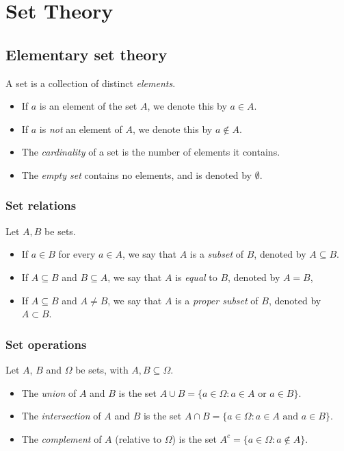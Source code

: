 \chapter{Set Theory}\label{chap:sets}
\section{Elementary set theory}
A set is a collection of distinct \emph{elements}.
\begin{itemize}
\item If $a$ is an element of the set $A$, we denote this by $a\in A$.
\item If $a$ is \emph{not} an element of $A$, we denote this by $a\notin A$.
\item The \emph{cardinality} of a set is the number of elements it contains.
\item The \emph{empty set} contains no elements, and is denoted by $\emptyset$.
\end{itemize}

\subsection{Set relations}
Let $A,B$ be sets. 
\begin{itemize}
\item If $a\in B$ for every $a\in A$, we say that $A$ is a \emph{subset} of $B$, denoted by $A\subseteq B$.
\item If $A\subseteq B$ and $B\subseteq A$, we say that $A$ is \emph{equal} to $B$, denoted by $A=B$, 
\item If $A\subseteq B$ and $A\neq B$, we say that $A$ is a \emph{proper subset} of $B$, denoted by $A\subset B$.
\end{itemize}

\subsection{Set operations}
Let $A$, $B$ and $\Omega$ be sets, with $A,B\subseteq \Omega$.
\begin{itemize}
\item The \emph{union} of $A$ and $B$ is the set $A\cup B = \{a\in \Omega: a\in A \text{ or }a\in B\}$.
\item The \emph{intersection} of $A$ and $B$ is the set $A\cap B = \{a\in \Omega: a\in A \text{ and }a\in B\}$.
\item The \emph{complement} of $A$ (relative to $\Omega$) is the set $A^c=\{a\in \Omega:a\notin A\}$.
\end{itemize}

